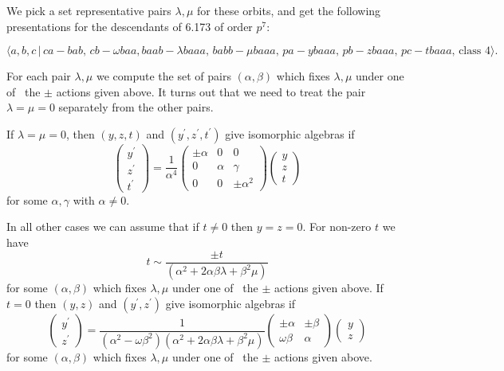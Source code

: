 \documentclass[10pt]{article}
\begin{document}
We pick a set representative pairs $\lambda ,\mu $ for these orbits, and get
the following presentations for the descendants of 6.173 of order $p^{7}$:

\begin{equation}
\langle a,b,c\,|\,ca-bab,\,cb-\omega baa,baab-\lambda baaa,\,babb-\mu
baaa,\,pa-ybaaa,\,pb-zbaaa,\,pc-tbaaa,\,\text{class }4\rangle .  \tag{7.1777}
\end{equation}

For each pair $\lambda ,\mu $ we compute the set of pairs $(\alpha ,\beta )$
which fixes $\lambda ,\mu $ under one of \ the $\pm $ actions given above.
It turns out that we need to treat the pair $\lambda =\mu =0$ separately
from the other pairs.

If $\lambda =\mu =0$, then $(y,z,t)$ and $(y^{\prime },z^{\prime },t^{\prime
})$ give isomorphic algebras if%
\[
\left( 
\begin{array}{c}
y^{\prime } \\ 
z^{\prime } \\ 
t^{\prime }%
\end{array}%
\right) =\frac{1}{\alpha ^{4}}\left( 
\begin{array}{ccc}
\pm \alpha & 0 & 0 \\ 
0 & \alpha & \gamma \\ 
0 & 0 & \pm \alpha ^{2}%
\end{array}%
\right) \left( 
\begin{array}{c}
y \\ 
z \\ 
t%
\end{array}%
\right) 
\]%
for some $\alpha ,\gamma $ with $\alpha \neq 0$.

In all other cases we can assume that if $t\neq 0$ then $y=z=0$. For
non-zero $t$ we have%
\[
t\sim \frac{\pm t}{(\alpha ^{2}+2\alpha \beta \lambda +\beta ^{2}\mu )} 
\]%
for some $(\alpha ,\beta )$ which fixes $\lambda ,\mu $ under one of \ the $%
\pm $ actions given above. If $t=0$ then $(y,z)$ and $(y^{\prime },z^{\prime
})$ give isomorphic algebras if%
\[
\left( 
\begin{array}{c}
y^{\prime } \\ 
z^{\prime }%
\end{array}%
\right) =\frac{1}{(\alpha ^{2}-\omega \beta ^{2})(\alpha ^{2}+2\alpha \beta
\lambda +\beta ^{2}\mu )}\left( 
\begin{array}{cc}
\pm \alpha & \pm \beta \\ 
\omega \beta & \alpha%
\end{array}%
\right) \left( 
\begin{array}{c}
y \\ 
z%
\end{array}%
\right) 
\]%
for some $(\alpha ,\beta )$ which fixes $\lambda ,\mu $ under one of \ the $%
\pm $ actions given above.
\end{document}
